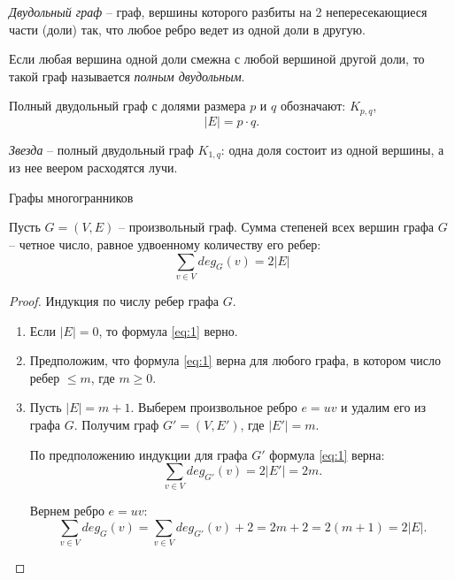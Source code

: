 \begin{example}
    \emph{Двудольный граф} -- граф, вершины которого разбиты на 2 непересекающиеся части (доли) так, что любое ребро ведет из одной доли в другую.

    Если любая вершина одной доли смежна с любой вершиной другой доли, то такой граф называется \emph{полным двудольным}.

    Полный двудольный граф с долями размера $ p $ и $ q $ обозначают: $ K_{p,q} $,
    \[
        | E | = p\cdot q.
    \]
    \begin{figure}[H]
        \centering
        \label{fig:fig_02}
    \end{figure}
\end{example}

\begin{example}
    \emph{Звезда} -- полный двудольный граф $ K_{1,q} $: одна доля состоит из одной вершины, а из нее веером расходятся лучи.
    \begin{figure}[H]
        \centering
        \label{fig:fig_03}
    \end{figure}
\end{example}

\begin{example}
    Графы многогранников
    \begin{figure}[H]
        \centering
        \label{fig:fig_04}
    \end{figure}
\end{example}

\begin{lemma}[О рукопожатиях]
    Пусть $ G=(V,E) $ -- произвольный граф. Сумма степеней всех вершин графа $ G $ -- четное число, равное удвоенному количеству его ребер:
    \begin{equation}\label{eq:1}
        \sum_{v \in V}deg_G(v) = 2 | E |
    \end{equation}
\end{lemma}

\begin{proof}
    Индукция по числу ребер графа $ G $.
    \begin{enumerate}
        \item Если $ | E | = 0 $, то формула \ref{eq:1} верно.
        \item Предположим, что формула \ref{eq:1} верна для любого графа, в котором число ребер $ \leqslant m $, где $ m \geqslant 0 $.
        \item Пусть $ | E | = m+1 $. Выберем произвольное ребро $ e = uv $ и удалим его из графа $ G $. Получим граф $ G' = (V,E') $, где $ | E' | = m $.

              По предположению индукции для графа $ G' $ формула \ref{eq:1} верна:
              \[
                  \sum_{v \in V}deg_{G'}(v) = 2 | E' | = 2m.
              \]

              Вернем ребро $ e = uv $:
              \[
                  \sum_{v \in V}deg_G(v) = \sum_{v \in V}deg_{G'}(v) + 2 = 2m+2 = 2(m+1) = 2 | E | .
              \]
    \end{enumerate}
\end{proof}

